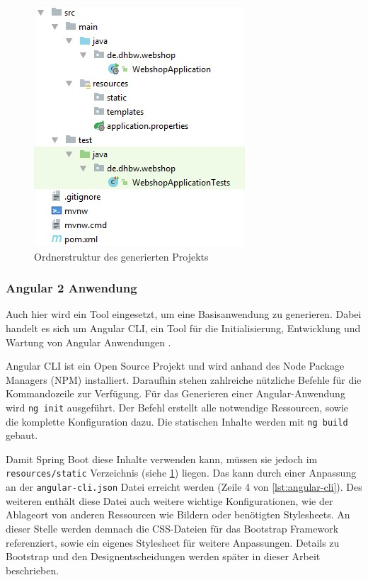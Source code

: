 \begin{figure}[th!]
	\centering
	\includegraphics[width=0.5\linewidth]{bilder/kap7/init-project}
	\caption{Ordnerstruktur des generierten Projekts}
	\label{fig:init-project}
\end{figure}

\subsubsection{Angular 2 Anwendung}\label{angular_setup}
Auch hier wird ein Tool eingesetzt, um eine Basisanwendung zu generieren. Dabei handelt es sich um Angular CLI, ein Tool für die Initialisierung, Entwicklung und Wartung von Angular Anwendungen \cite{Arora2017}.

Angular CLI ist ein Open Source Projekt und wird anhand des Node Package Managers (\acs{NPM}) installiert.
Daraufhin stehen zahlreiche nützliche Befehle für die Kommandozeile zur Verfügung.
Für das Generieren einer Angular-Anwendung wird \texttt{ng init} ausgeführt. Der Befehl erstellt alle notwendige Ressourcen, sowie die komplette Konfiguration dazu.
Die statischen Inhalte werden mit \texttt{ng build} gebaut.

Damit Spring Boot diese Inhalte verwenden kann, müssen sie jedoch im  \texttt{resources/static} Verzeichnis (siehe \cref{fig:init-project}) liegen.
Das kann durch einer Anpassung an der \texttt{angular-cli.json} Datei erreicht werden (Zeile 4 von \cref{lst:angular-cli}).
Des weiteren enthält diese Datei auch weitere wichtige Konfigurationen, wie der Ablageort von anderen Ressourcen wie Bildern oder benötigten Stylesheets.
An dieser Stelle werden demnach die \acs{CSS}-Dateien für das Bootstrap Framework referenziert, sowie ein eigenes Stylesheet für weitere Anpassungen.
Details zu Bootstrap und den Designentscheidungen werden später in dieser Arbeit beschrieben.
\\


